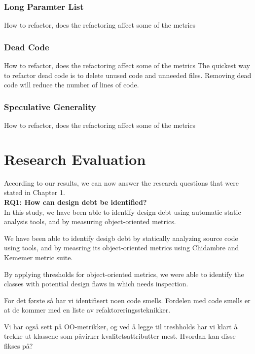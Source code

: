 \subsubsection{Long Paramter List}
How to refactor, does the refactoring affect some of the metrics

\subsubsection{Dead Code}
How to refactor, does the refactoring affect some of the metrics
The quickest way to refactor dead code is to delete unused code and unneeded files. Removing dead code will reduce the number of lines of code. 

\subsubsection{Speculative Generality}
How to refactor, does the refactoring affect some of the metrics


\section{Research Evaluation}
According to our results, we can now answer the research questions that were stated in Chapter 1.
\\
\textbf{RQ1: How can design debt be identified?} \\
In this study, we have been able to identify design debt using automatic static analysis tools, and by measuring object-oriented metrics.

We have been able to identify desigb debt by statically analyzing source code using tools, and by measring its object-oriented metrics using Chidambre and Kememer metric suite.

By applying thresholds for object-oriented metrics, we were able to identify the classes with potential design flaws in which needs inspection.

For det første så har vi identifisert noen code smells. Fordelen med code smells er at de kommer med en liste av refaktoreringssteknikker. 

Vi har også sett på OO-metrikker, og ved å legge til treshholds har vi klart å trekke ut klassene som påvirker kvalitetsattributter mest. Hvordan kan disse fikses på?

